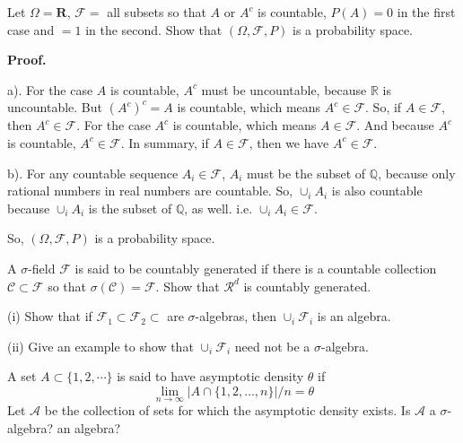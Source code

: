 \documentclass[en, normal, 11pt, black]{elegantnote}
\newenvironment{exercise}[1]{\begin{tcolorbox}[title=#1]}{\end{tcolorbox}}
\renewcommand{\proof}{\textbf{Proof. }\par}
\begin{document}
    \begin{exercise}{1.1.1}
        Let $\Omega=\mathbf{R}$, $\mathcal{F}=$ all subsets so that $A$ or $A^c$ is countable, $P(A) = 0$ in the first case and $= 1$ in the second. Show that $(\Omega,\mathcal{F},P)$ is a probability space. 
    \end{exercise}
    \proof 
    a). For the case $A$ is countable, $A^c$ must be uncountable, because $\mathbb{R}$ is uncountable. But $(A^c)^c=A$ is countable, which means $A^c\in\mathcal{F}$. So, if $A\in\mathcal{F}$, then $A^c\in\mathcal{F}$. For the case $A^c$ is countable, which means $A\in\mathcal{F}$. And because $A^c$ is countable, $A^c\in\mathcal{F}$. In summary, if $A\in\mathcal{F}$, then we have $A^c\in\mathcal{F}$. 

    b). For any countable sequence $A_i\in\mathcal{F}$, $A_i$ must be the subset of $\mathbb{Q}$, because only rational numbers in real numbers are countable. So, $\cup_iA_i$ is also countable because $\cup_iA_i$ is the subset of $\mathbb{Q}$, as well. i.e. $\cup_iA_i\in\mathcal{F}$. 

    So, $(\Omega,\mathcal{F},P)$ is a probability space. 
    \begin{exercise}{1.1.3}
        A $\sigma$-field $\mathcal{F}$ is said to be countably generated if there is a countable collection $\mathcal{C} \subset \mathcal{F}$ so that $\sigma(\mathcal{C}) = \mathcal{F}$. Show that $\mathcal{R}^d$ is countably generated. 
    \end{exercise}

    \begin{exercise}{1.1.4}
        (i) Show that if $\mathcal{F}_1\subset\mathcal{F}_2\subset$ are $\sigma$-algebras, then $\cup_i\mathcal{F}_i$ is an algebra. 
        
        (ii) Give an example to show that $\cup_i\mathcal{F}_i$ need not be a $\sigma$-algebra. 
    \end{exercise}

    \begin{exercise}{1.1.5}
        A set $A \subset \{1,2, \cdots\}$ is said to have asymptotic density $\theta$ if
        \[
        \lim _{n \rightarrow \infty}|A \cap\{1,2, \ldots, n\}| / n=\theta
        \]
        Let $\mathcal{A}$ be the collection of sets for which the asymptotic density exists. Is $\mathcal{A}$ a $\sigma$-algebra? an algebra?
    \end{exercise}
\end{document}
